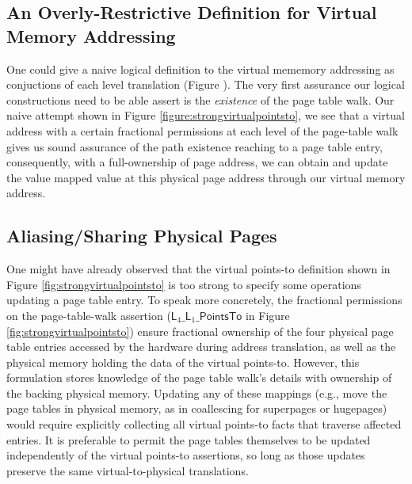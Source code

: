 \subsection{An Overly-Restrictive Definition for Virtual Memory Addressing}
One could give a naive logical definition to the virtual mememory addressing as conjuctions of each level translation 
(Figure ). The very first assurance our logical constructions need to be able assert is 
the \textit{existence} of the page table walk. Our naive attempt shown in Figure \ref{figure:strongvirtualpointsto}, 
we see that a virtual address with a certain fractional permissions at each level of the page-table walk gives us sound 
assurance of the path existence reaching to a page table entry, consequently, with a full-ownership of page address, 
we can obtain and update the value mapped value at this physical page address through our virtual memory address. 

\subsection{Aliasing/Sharing Physical Pages}
  \label{sec:sharingpages}  
  One might have already observed that the virtual points-to definition shown in Figure \ref{fig:strongvirtualpointsto} 
  is too strong to specify some operations updating a page table entry.
   To speak more concretely, the fractional permissions on the page-table-walk assertion ($\textsf{L}_{4}\_\textsf{L}_{1}\_\textsf{PointsTo}$ in Figure \ref{fig:strongvirtualpointsto}) 
  ensure fractional ownership of the four physical page table entries accessed by the hardware during address translation,
  as well as the physical memory holding the data of the virtual points-to.
  However, this formulation stores knowledge of the page table walk's details with ownership of the backing physical
  memory.
  Updating any of these mappings (e.g., move the page tables in physical memory, as in coallescing for
  superpages or hugepages)
  would require explicitly collecting all virtual points-to facts that traverse affected entries.
  It is preferable to permit the page tables themselves to be updated independently of the virtual points-to assertions,
  so long as those updates preserve the same virtual-to-physical translations.

